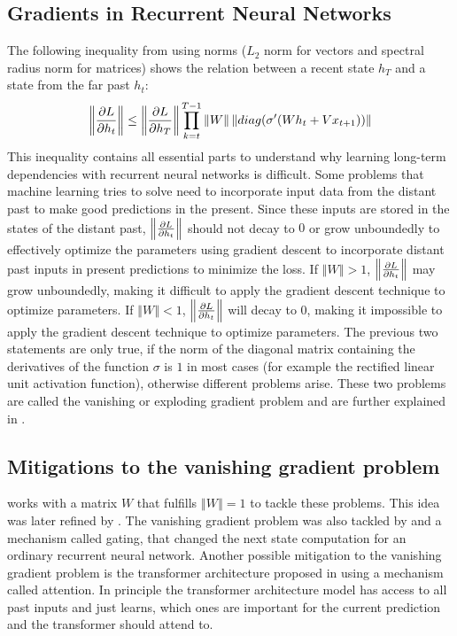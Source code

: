 \documentclass{article}
\begin{document}
\subsection{Gradients in Recurrent Neural Networks}
The following inequality from \cite{UnitaryRNNs} using norms ($L_2$ norm for vectors and spectral radius norm for matrices) shows the relation between a recent state $h_T$ and a state from the far past $h_t$:
\begin{align}
    \left\Vert \pdv{L}{h_t} \right\Vert \leq \left\Vert \pdv{L}{h_T} \right\Vert \prod^{T-1}_{k=t} \left\Vert W \right\Vert \left\Vert diag(\sigma'(Wh_t + Vx_{t+1})) \right\Vert
\end{align}
This inequality contains all essential parts to understand why learning long-term dependencies with recurrent neural networks is difficult. 
Some problems that machine learning tries to solve need to incorporate input data from the distant past to make good predictions in the present.
Since these inputs are stored in the states of the distant past, $\left\Vert \pdv{L}{h_t} \right\Vert$ should not decay to $0$ or grow unboundedly to effectively optimize the parameters using gradient descent to incorporate distant past inputs in present predictions to minimize the loss. 
If $\left\Vert W \right\Vert > 1$, $\left\Vert \pdv{L}{h_t} \right\Vert$ may grow unboundedly, making it difficult to apply the gradient descent technique to optimize parameters. 
If $\left\Vert W \right\Vert < 1$, $\left\Vert \pdv{L}{h_t} \right\Vert$ will decay to $0$, making it impossible to apply the gradient descent technique to optimize parameters. 
The previous two statements are only true, if the norm of the diagonal matrix containing the derivatives of the function $\sigma$ is $1$ in most cases (for example the rectified linear unit activation function), otherwise different problems arise.
These two problems are called the vanishing or exploding gradient problem and are further explained in \cite{LongTermDependenciesGradientDescent}.
\subsection{Mitigations to the vanishing gradient problem}
\cite{UnitaryRNNs} works with a matrix $W$ that fulfills $\left\Vert W \right\Vert = 1$ to tackle these problems. 
This idea was later refined by \cite{EfficientUnitaryRNNs}. 
The vanishing gradient problem was also tackled by \cite{LSTM} and a mechanism called gating, that changed the next state computation for an ordinary recurrent neural network.
Another possible mitigation to the vanishing gradient problem is the transformer architecture proposed in \cite{Transformer} using a mechanism called attention. 
In principle the transformer architecture model has access to all past inputs and just learns, which ones are important for the current prediction and the transformer should attend to. 
\end{document}
